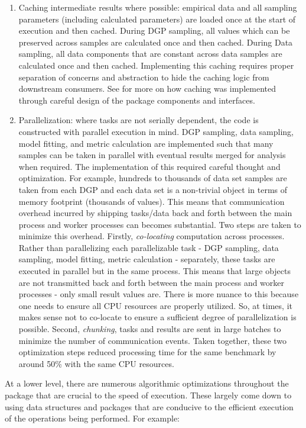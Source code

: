 \documentclass[./main.tex]{subfiles}
\begin{document}
\begin{enumerate}
    \item Caching intermediate results where possible: empirical data and all sampling parameters (including calculated parameters) are loaded once at the start of execution and then cached. During DGP sampling, all values which can be preserved across samples are calculated once and then cached. During Data sampling, all data components that are constant across data samples are calculated once and then cached. Implementing this caching requires proper separation of concerns and abstraction to hide the caching logic from downstream consumers. See  for more on how caching was implemented through careful design of the package components and interfaces.
    
    \item Parallelization: where tasks are not serially dependent, the code is constructed with parallel execution in mind. DGP sampling, data sampling, model fitting, and metric calculation are implemented such that many samples can be taken in parallel with eventual results merged for analysis when required. The implementation of this required careful thought and optimization. For example, hundreds to thousands of data set samples are taken from each DGP and each data set is a non-trivial object in terms of memory footprint (thousands of values). This means that communication overhead incurred by shipping tasks/data back and forth between the main process and worker processes can becomes substantial. Two steps are taken to minimize this overhead. Firstly, \textit{co-locating} computation across processes. Rather than parallelizing each parallelizable task - DGP sampling, data sampling, model fitting, metric calculation - separately, these tasks are executed in parallel but in the same process. This means that large objects are not transmitted back and forth between the main process and worker processes - only small result values are. There is more nuance to this because one needs to ensure all CPU resources are properly utilized. So, at times, it makes sense not to co-locate to ensure a sufficient degree of parallelization is possible. Second, \textit{chunking}, tasks and results are sent in large batches to minimize the number of communication events. Taken together, these two optimization steps reduced processing time for the same benchmark by around 50\% with the same CPU resources.
\end{enumerate}
 
At a lower level, there are numerous algorithmic optimizations throughout the package that are crucial to the speed of execution. These largely come down to using data structures and packages that are conducive to the efficient execution of the operations being performed. For example:
\end{document}
